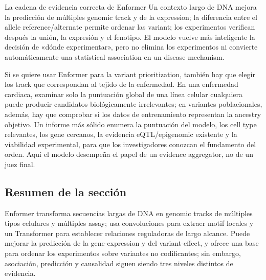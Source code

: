 \begin{importantbox}{La cadena de evidencia correcta de Enformer}
Un contexto largo de DNA mejora la predicción de múltiples genomic track y de la expression; la diferencia entre el allele reference/alternate permite ordenar las variant; los experimentos verifican después la unión, la expresión y el fenotipo. El modelo vuelve más inteligente la decisión de «dónde experimentar», pero no elimina los experimentos ni convierte automáticamente una statistical association en un disease mechanism.
\end{importantbox}

Si se quiere usar Enformer para la variant prioritization, también hay que elegir los track que correspondan al tejido de la enfermedad. En una enfermedad cardiaca, examinar solo la puntuación global de una línea celular cualquiera puede producir candidatos biológicamente irrelevantes; en variantes poblacionales, además, hay que comprobar si los datos de entrenamiento representan la ancestry objetivo. Un informe más sólido enumera la puntuación del modelo, los cell type relevantes, los gene cercanos, la evidencia eQTL/epigenomic existente y la viabilidad experimental, para que los investigadores conozcan el fundamento del orden. Aquí el modelo desempeña el papel de un evidence aggregator, no de un juez final.

\subsection{Resumen de la sección}

Enformer transforma secuencias largas de DNA en genomic tracks de múltiples tipos celulares y múltiples assay; usa convoluciones para extraer motif locales y un Transformer para establecer relaciones reguladoras de largo alcance. Puede mejorar la predicción de la gene-expression y del variant-effect, y ofrece una base para ordenar los experimentos sobre variantes no codificantes; sin embargo, asociación, predicción y causalidad siguen siendo tres niveles distintos de evidencia.
